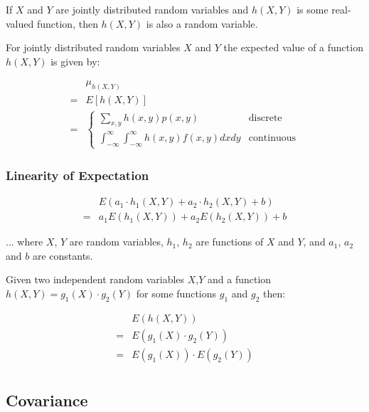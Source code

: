 If $X$ and $Y$ are jointly distributed random variables and $h(X,Y)$ is some real-valued function, then $h(X,Y)$ is also a random variable.

For jointly distributed random variables $X$ and $Y$ the expected value of a function $h(X,Y)$ is given by:

\begin{align*}
      & \mu_{h(X,Y)}                                                                                                                                                    \\
    = & E[h(X,Y)]                                                                                                                                                       \\
    = & \begin{cases} \sum_{x,y} h(x,y) p(x,y) & \text{discrete} \\ \int_{-\infty}^{\infty} \int_{-\infty}^{\infty} h(x,y) f(x,y) dx dy & \text{continuous} \end{cases}
\end{align*}

\subsubsection{Linearity of Expectation}

\begin{align*}
      & E(a_1\cdot h_1(X,Y) + a_2\cdot h_2(X,Y) + b) \\
    = & a_1 E(h_1(X,Y)) + a_2 E(h_2(X,Y)) + b
\end{align*}

... where $X$, $Y$ are random variables, $h_1$, $h_2$ are functions of $X$ and $Y$, and $a_1$, $a_2$ and $b$ are constants.

Given two independent random variables $X$,$Y$ and a function $h(X,Y)=g_1(X)\cdot g_2(Y)$ for some functions $g_1$ and $g_2$ then:

\begin{align*}
      & E(h(X,Y))                 \\
    = & E(g_1(X)\cdot g_2(Y))     \\
    = & E(g_1(X)) \cdot E(g_2(Y)) \\
\end{align*}

\subsection{Covariance}

